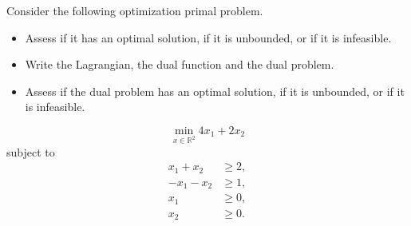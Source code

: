 

Consider  the following optimization primal problem.
\begin{itemize}
\item Assess if it has an optimal solution, if it is unbounded, or if it
  is infeasible.
\item Write the Lagrangian, the dual function and the dual problem.
\item Assess if the dual problem  has an optimal solution, if it is unbounded, or if it  is infeasible.
\end{itemize}

$$\min_{x \in \mathbb{R}^2} 4x_1+2x_2$$ 
subject to 
\begin{align*}
x_1+x_2 & \geq 2,\\
-x_1-x_2 & \geq 1,\\
x_1 & \geq 0,\\
x_2 & \geq 0.
\end{align*}
